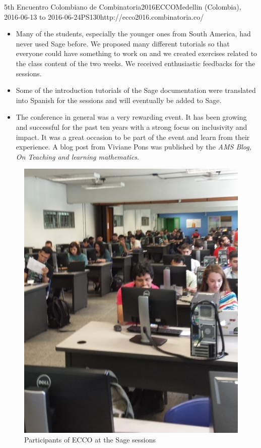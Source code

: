 \begin{event}{5th Encuentro Colombiano de Combinatoria}{2016ECCO}{Medellin (Colombia), 2016-06-13 to 2016-06-24}{PS}{130}{http://ecco2016.combinatoria.co/}
\begin{itemize}
\item Many of the students, especially the younger ones from South America, had never used
Sage before. We proposed many different tutorials so that everyone could have something to
work on and we created exercises related to the class content of the two weeks. We received
 enthusiastic feedbacks for the sessions.

\item Some of the introduction tutorials of the Sage documentation were translated into 
Spanish for the sessions and will eventually be added to Sage.

\item The conference in general was a very rewarding event. It has been growing and successful
for the past ten years with a strong focus on inclusivity and impact. It was a great occasion
to be part of the event and learn from their experience. A blog post from Viviane Pons was
published by the \emph{AMS Blog, On Teaching and learning mathematics}\cite{16PonsECCO}.
\end{itemize}



\begin{figure}[ht]
\caption*{Participants of ECCO at the Sage sessions}
\includegraphics[scale=0.5]{pictures/ECCO-1.jpg}


\end{figure}
\end{event}
